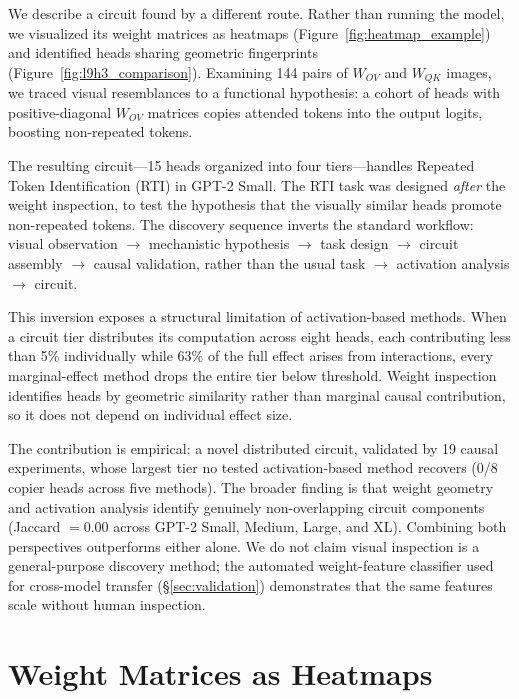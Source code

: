 \documentclass{article}
\begin{document}
We describe a circuit found by a different route. Rather than running
the model, we visualized its weight matrices as heatmaps
(Figure~\ref{fig:heatmap_example}) and identified heads sharing
geometric fingerprints (Figure~\ref{fig:l9h3_comparison}). Examining
144 pairs of $W_{OV}$ and $W_{QK}$ images, we traced visual
resemblances to a functional hypothesis: a cohort of heads with
positive-diagonal $W_{OV}$ matrices copies attended tokens into the
output logits, boosting non-repeated tokens.

The resulting circuit---15 heads organized into four tiers---handles
Repeated Token Identification (RTI) in GPT-2 Small. The RTI task was
designed \emph{after} the weight inspection, to test the hypothesis
that the visually similar heads promote non-repeated tokens.
The discovery sequence inverts the standard workflow: visual
observation $\to$ mechanistic hypothesis $\to$ task design $\to$
circuit assembly $\to$ causal validation, rather than the usual
task $\to$ activation analysis $\to$ circuit.

This inversion exposes a structural limitation of activation-based
methods. When a circuit tier distributes its computation across eight
heads, each contributing less than 5\% individually while 63\% of
the full effect arises from interactions, every marginal-effect method
drops the entire tier below threshold. Weight inspection identifies heads by
geometric similarity rather than marginal causal contribution, so it
does not depend on individual effect size.

The contribution is empirical: a novel distributed circuit, validated
by 19 causal experiments, whose largest tier no tested activation-based
method recovers (0/8 copier heads across five methods). The broader finding is that weight geometry and activation
analysis identify genuinely non-overlapping circuit components
(Jaccard $= 0.00$ across GPT-2 Small, Medium, Large, and XL).
Combining both perspectives outperforms either alone. We do not claim visual
inspection is a general-purpose discovery method; the automated
weight-feature classifier used for cross-model transfer
(\S\ref{sec:validation}) demonstrates that the same features scale
without human inspection.


\section{Weight Matrices as Heatmaps}
\label{sec:heatmaps}
\end{document}
